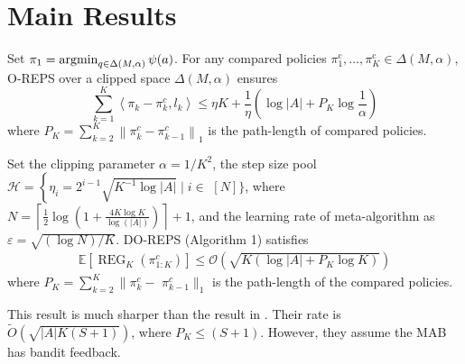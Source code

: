 \documentclass[11pt]{article}
\begin{document}
\section{Main Results}
\begin{lemma}
\label{lem: bound for single agent}
Set $\pi_1 = \mathop{\mathrm{argmin}}_{q\in \Delta(M,\alpha)} \psi(a)$. For any compared policies $\pi_1^{\mathrm{c}}, \ldots, \pi_K^{\mathrm{c}} \in \Delta(M, \alpha)$,
O-REPS over a clipped space $\Delta(M, \alpha)$ ensures
$$
\sum_{k=1}^K\left\langle \pi_k-\pi_k^c, l_k\right\rangle \leq \eta K+\frac{1}{\eta}\left( \log | A|+P_K \log \frac{1}{\alpha}\right)
$$
where $P_K=\sum_{k=2}^K\left\|\pi_k^c-\pi_{k-1}^c\right\|_1$ is the path-length of compared policies. 
\end{lemma}





\begin{theorem}
\label{thm: DO-REPS for MAB}
Set the clipping parameter $\alpha = 1/K^2$, the step size pool $\mathcal{H}=\left\{\eta_i=2^{i-1} \sqrt{K^{-1} \log |A|} \mid i \in\right.$
$[N]\}$, where $N=\left\lceil\frac{1}{2} \log \left(1+\frac{4 K \log K}{\log (|A| )}\right)\right\rceil+1$, and the
learning rate of meta-algorithm as $\varepsilon=\sqrt{(\log N) /K}$. DO-REPS (Algorithm 1) satisfies
$$
\begin{aligned}
\mathbb{E}\left[\operatorname{REG}_K\left(\pi_{1: K}^c\right)\right]  \leq \mathcal{O}\left( \sqrt{K\left(\log | A|+P_K \log K\right)}\right)
\end{aligned}
$$
where  $P_K=\sum_{k=2}^K  \| \pi_{k}^c-$ $\pi_{k-1}^c \|_{1}$ is the path-length of the compared policies.
\end{theorem}

\begin{remark}
This result is much sharper than the result in \citep{abbasi2022new}. Their rate is $\tilde O(\sqrt{|A|K(S+1)})$, where $P_K \le (S+1)$. However, they assume the MAB has bandit feedback. 
\end{remark}

\newpage
\end{document}
